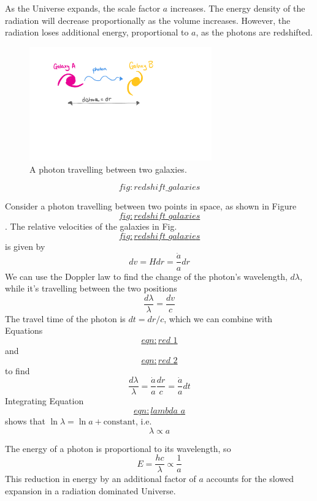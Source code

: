 \documentclass[]{book}
\begin{document}
As the Universe expands, the scale factor \(a\) increases. The energy
density of the radiation will decrease proportionally as the volume
increases. However, the radiation loses additional energy, proportional
to \(a\), as the photons are redshifted.

\begin{figure}
\centering
\includegraphics[width=0.7\textwidth,height=\textheight]{Images/redshift_galaxies.pdf}
\caption{A photon travelling between two
galaxies.}
\end{figure}

\protect\hypertarget{fig:redshift_galaxies}{}{\[fig:redshift\_galaxies\]}

Consider a photon travelling between two points in space, as shown in
Figure~\protect\hyperlink{fig:redshift_galaxies}{\[fig:redshift\_galaxies\]}. The relative velocities of the
galaxies in
Fig.~\protect\hyperlink{fig:redshift_galaxies}{\[fig:redshift\_galaxies\]} is given by \[\label{eqn:red_1}
    dv = H dr = \dfrac{\dot{a}}{a} dr\] We can use the Doppler law to
find the change of the photon's wavelength, \(d\lambda\), while it's
travelling between the two positions \[\label{eqn:red_2}
    \dfrac{d\lambda}{\lambda} = \dfrac{dv}{c}\] The travel time of the
photon is \(dt = dr/c\), which we can combine with
Equations~\protect\hyperlink{eqn:red_1}{\[eqn:red\_1\]} and
\protect\hyperlink{eqn:red_2}{\[eqn:red\_2\]}
to find \[\label{eqn:lambda_a}
    \dfrac{d\lambda}{\lambda} = \dfrac{\dot{a}}{a} \dfrac{dr}{c} = \dfrac{\dot{a}}{a} dt\]
Integrating
Equation~\protect\hyperlink{eqn:lambda_a}{\[eqn:lambda\_a\]} shows that
\(\ln \lambda = \ln a + \text{constant}\), i.e. \[\lambda \propto a\]

The energy of a photon is proportional to its wavelength, so
\[E = \dfrac{h c}{\lambda} \propto \dfrac{1}{a}\] This reduction in
energy by an additional factor of \(a\) accounts for the slowed expansion
in a radiation dominated Universe.
\end{document}
